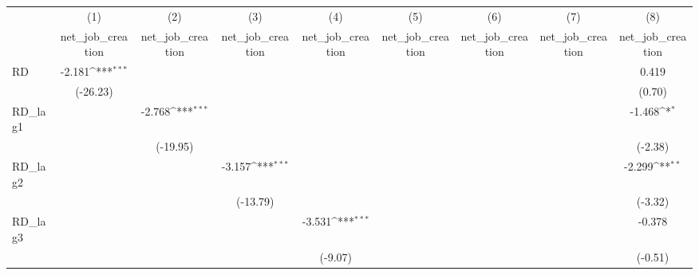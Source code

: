 {
\def\sym#1{\ifmmode^{#1}\else\(^{#1}\)\fi}
\begin{tabular}{l*{8}{c}}
\toprule
            &\multicolumn{1}{c}{(1)}&\multicolumn{1}{c}{(2)}&\multicolumn{1}{c}{(3)}&\multicolumn{1}{c}{(4)}&\multicolumn{1}{c}{(5)}&\multicolumn{1}{c}{(6)}&\multicolumn{1}{c}{(7)}&\multicolumn{1}{c}{(8)}\\
            &\multicolumn{1}{c}{net\_job\_creation}&\multicolumn{1}{c}{net\_job\_creation}&\multicolumn{1}{c}{net\_job\_creation}&\multicolumn{1}{c}{net\_job\_creation}&\multicolumn{1}{c}{net\_job\_creation}&\multicolumn{1}{c}{net\_job\_creation}&\multicolumn{1}{c}{net\_job\_creation}&\multicolumn{1}{c}{net\_job\_creation}\\
\midrule
RD          &      -2.181\sym{***}&                     &                     &                     &                     &                     &                     &       0.419         \\
            &    (-26.23)         &                     &                     &                     &                     &                     &                     &      (0.70)         \\
\addlinespace
RD\_lag1     &                     &      -2.768\sym{***}&                     &                     &                     &                     &                     &      -1.468\sym{*}  \\
            &                     &    (-19.95)         &                     &                     &                     &                     &                     &     (-2.38)         \\
\addlinespace
RD\_lag2     &                     &                     &      -3.157\sym{***}&                     &                     &                     &                     &      -2.299\sym{**} \\
            &                     &                     &    (-13.79)         &                     &                     &                     &                     &     (-3.32)         \\
\addlinespace
RD\_lag3     &                     &                     &                     &      -3.531\sym{***}&                     &                     &                     &      -0.378         \\
            &                     &                     &                     &     (-9.07)         &                     &                     &                     &     (-0.51)         \\

\end{tabular}}
